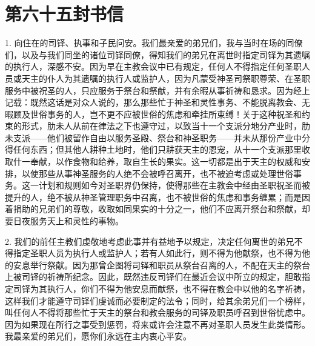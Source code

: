 \section{第六十五封书信}

\par

\par

1. 向住在的司铎、执事和子民问安。我们最亲爱的弟兄们，我与当时在场的同僚们，以及与我们同坐的诸位司铎同僚，得知我们的弟兄在离世时指定司铎为其遗嘱的执行人，深感不安。因为早在主教会议中已有规定，任何人不得指定任何圣职人员或天主的仆人为其遗嘱的执行人或监护人，因为凡蒙受神圣司祭职尊荣、在圣职服务中被祝圣的人，只应服务于祭台和祭献，并有余暇从事祈祷和恳求。因为经上记载：既然这话是对众人说的，那么那些忙于神圣和灵性事务、不能脱离教会、无暇顾及世俗事务的人，岂不更不应被世俗的焦虑和牵挂所束缚！关于这种祝圣和约束的形式，肋未人从前在律法之下也遵守过，以致当十一个支派分地分产业时，肋未支派——他们被留作自由以服务圣殿、祭台和神圣职务——并未从那份产业中分得任何东西；但其他人耕种土地时，他们只耕获天主的恩宠，从十一个支派那里收取什一奉献，以作食物和给养，取自生长的果实。这一切都是出于天主的权威和安排，以使那些从事神圣服务的人绝不会被呼召离开，也不被迫考虑或处理世俗事务。这一计划和规则如今对圣职界仍保持，使得那些在主教会中经由圣职祝圣而被提升的人，绝不被从神圣管理职务中召离，也不被世俗的焦虑和事务缠累；而是因着捐助的兄弟们的尊敬，收取如同果实的十分之一，他们不应离开祭台和祭献，却要日夜服务天上和灵性的事物。\par

2. 我们的前任主教们虔敬地考虑此事并有益地予以规定，决定任何离世的弟兄不得指定圣职人员为执行人或监护人；若有人如此行，则不得为他献祭，也不得为他的安息举行祭献。因为那曾企图将司铎和职员从祭台召离的人，不配在天主的祭台上被司铎的祈祷所纪念。因此，既然违反司铎们在最近会议中所立的规定，胆敢指定司铎为其执行人，你们不得为他安息而献祭，也不得在教会中以他的名字祈祷，这样我们才能遵守司铎们虔诚而必要制定的法令；同时，给其余弟兄们一个榜样，叫任何人不得将那些忙于天主的祭台和教会服务的司铎及职员呼召到世俗忧虑中。因为如果现在所行之事受到惩罚，将来或许会注意不再对圣职人员发生此类情形。我最亲爱的弟兄们，愿你们永远在主内衷心平安。\par

